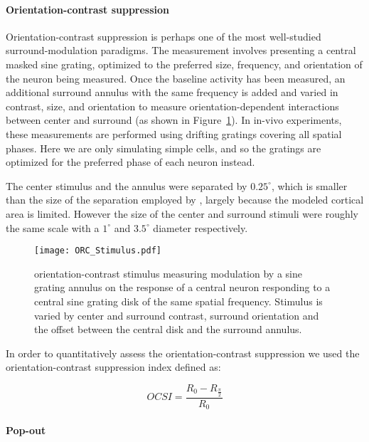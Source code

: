 \paragraph{Orientation-contrast suppression}

Orientation-contrast suppression is perhaps one of the most
well-studied surround-modulation paradigms. The measurement involves
presenting a central masked sine grating, optimized to the preferred
size, frequency, and orientation of the neuron being measured. Once
the baseline activity has been measured, an additional surround
annulus with the same frequency is added and varied in contrast, size,
and orientation to measure orientation-dependent interactions between
center and surround (as shown in Figure~\ref{ORC_Stimulus}). In
in-vivo experiments, these measurements are performed using drifting
gratings covering all spatial phases.  Here we are only simulating
simple cells, and so the gratings are optimized for the preferred
phase of each neuron instead.

The center stimulus and the annulus were separated by $0.25^\circ$,
which is smaller than the size of the separation employed by
\cite{Jones2002}, largely because the modeled cortical area is
limited. However the size of the center and surround stimuli were
roughly the same scale with a $1^\circ$ and $3.5^\circ$ diameter
respectively.

\begin{figure}
	\centering
        \texttt{[image: ORC\_Stimulus.pdf]}
	\caption{orientation-contrast stimulus measuring modulation by a
      sine grating annulus on the response of a central neuron
      responding to a central sine grating disk of the same spatial frequency.
      Stimulus is varied by center and surround contrast, surround
      orientation and the offset between the central disk and the
      surround annulus.}
	\label{ORC_Stimulus}
\end{figure}

In order to quantitatively assess the orientation-contrast suppression
we used the orientation-contrast suppression index defined as:

\begin{equation}
  OCSI = \frac{R_0 - R_{\frac{\pi}{2}}}{R_0}
\end{equation}

\paragraph{Pop-out}

